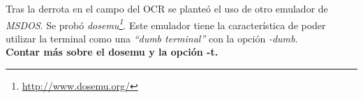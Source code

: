 \documentclass[10pt,a4paper]{article}
\begin{document}
Tras la derrota en el campo del OCR se planteó el uso de otro emulador de \emph{MSDOS}. Se probó \emph{dosemu\footnote{\url{http://www.dosemu.org/}}}. Este emulador tiene la característica de poder utilizar la terminal como una \emph{``dumb terminal''} con la opción \emph{-dumb}.\\

\textbf{Contar más sobre el dosemu y la opción -t.}
\end{document}
